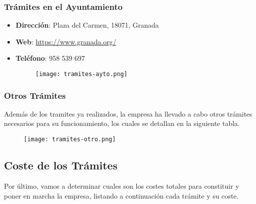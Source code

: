 \subsubsection*{Trámites en el Ayuntamiento}
\begin{itemize}
    \item \textbf{Dirección}:  Plaza del Carmen, 18071, Granada
    \item \textbf{Web}: \url{https://www.granada.org/}
    \item \textbf{Teléfono}: 958 539 697

    \begin{figure}[H]
        \centering
        \texttt{[image: tramites-ayto.png]}
    \end{figure}
\end{itemize}

\subsubsection*{Otros Trámites}
Además de los tramites ya realizados, la empresa ha llevado a cabo otros trámites necesarios para su funcionamiento, los cuales se detallan
en la siguiente tabla.

\begin{figure}[H]
    \centering
    \texttt{[image: tramites-otro.png]}
\end{figure}


\subsection{Coste de los Trámites}
\label{sec:costetramites}
Por último, vamos a determinar cuales son los costes totales para constituir y poner en marcha la empresa, listando a continuación cada trámite y su coste.

